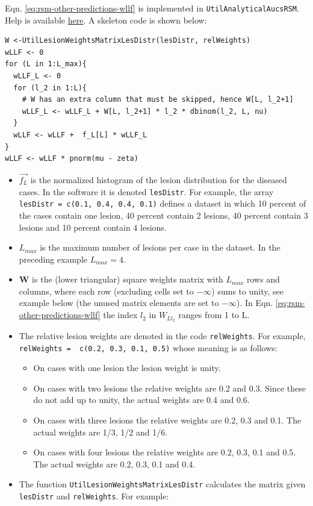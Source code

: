 \documentclass[
]{book}
\providecommand{\tightlist}{%
  \setlength{\itemsep}{0pt}\setlength{\parskip}{0pt}}
\begin{document}
Eqn. \eqref{eq:rsm-other-predictions-wllf} is implemented in \texttt{UtilAnalyticalAucsRSM}. Help is available \href{https://dpc10ster.github.io/RJafroc/reference/UtilAnalyticalAucsRSM.html}{here}. A skeleton code is shown below:

\begin{verbatim}
W <-UtilLesionWeightsMatrixLesDistr(lesDistr, relWeights)
wLLF <- 0
for (L in 1:L_max){
  wLLF_L <- 0
  for (l_2 in 1:L){
    # W has an extra column that must be skipped, hence W[L, l_2+1]
    wLLF_L <- wLLF_L + W[L, l_2+1] * l_2 * dbinom(l_2, L, nu)
  }
  wLLF <- wLLF +  f_L[L] * wLLF_L
}
wLLF <- wLLF * pnorm(mu - zeta)
\end{verbatim}

\begin{itemize}
\tightlist
\item
  \(\overrightarrow{f_L}\) is the normalized histogram of the lesion distribution for the diseased cases. In the software it is denoted \texttt{lesDistr}. For example, the array \texttt{lesDistr\ =\ c(0.1,\ 0.4,\ 0.4,\ 0.1)} defines a dataset in which 10 percent of the cases contain one lesion, 40 percent contain 2 lesions, 40 percent contain 3 lesions and 10 percent contain 4 lesions.
\item
  \(L_{max}\) is the maximum number of lesions per case in the dataset. In the preceding example \(L_{max} = 4\).
\item
  \(\mathbf{W}\) is the (lower triangular) square weights matrix with \(L_{max}\) rows and columns, where each row (excluding cells set to \(-\infty\)) sums to unity, see example below (the unused matrix elements are set to \(-\infty\)). In Eqn. \eqref{eq:rsm-other-predictions-wllf} the index \(l_2\) in \(W_{Ll_2}\) ranges from 1 to L.
\item
  The relative lesion weights are denoted in the code \texttt{relWeights}. For example, \texttt{relWeights\ =\ \ c(0.2,\ 0.3,\ 0.1,\ 0.5)} whose meaning is as follows:

  \begin{itemize}
  \tightlist
  \item
    On cases with one lesion the lesion weight is unity.
  \item
    On cases with two lesions the relative weights are 0.2 and 0.3. Since these do not add up to unity, the actual weights are 0.4 and 0.6.
  \item
    On cases with three lesions the relative weights are 0.2, 0.3 and 0.1. The actual weights are 1/3, 1/2 and 1/6.
  \item
    On cases with four lesions the relative weights are 0.2, 0.3, 0.1 and 0.5. The actual weights are 0.2, 0.3, 0.1 and 0.4.
  \end{itemize}
\item
  The function \texttt{UtilLesionWeightsMatrixLesDistr} calculates the matrix given \texttt{lesDistr} and \texttt{relWeights}. For example:
\end{itemize}
\end{document}
